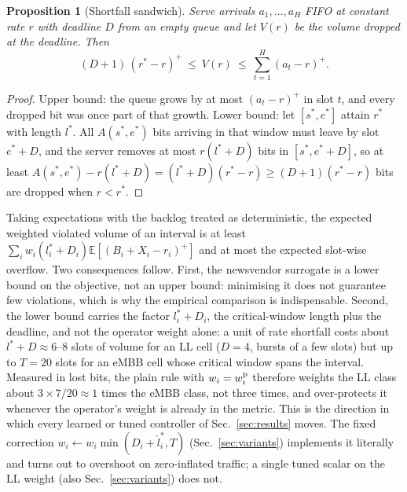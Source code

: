 \documentclass[journal]{IEEEtran}
\newtheorem{proposition}{Proposition}
\newcommand{\rstar}{r^{\ast}}
\newcommand{\E}{\mathbb{E}}
\begin{document}
\begin{proposition}[Shortfall sandwich]
\label{prop:sandwich}
Serve arrivals $a_1, \dots, a_H$ FIFO at constant rate $r$ with deadline $D$ from an empty queue and let $V(r)$ be the volume dropped at the deadline. Then
\begin{equation}
(D + 1)\,(\rstar - r)^+ \ \le\ V(r)\ \le\ \sum_{t = 1}^{H} (a_t - r)^+ .
\label{eq:sandwich}
\end{equation}
\end{proposition}
\begin{proof}
Upper bound: the queue grows by at most $(a_t - r)^+$ in slot $t$, and every dropped bit was once part of that growth. Lower bound: let $[s^\ast, e^\ast]$ attain $\rstar$ with length $l^\ast$. All $A(s^\ast, e^\ast)$ bits arriving in that window must leave by slot $e^\ast + D$, and the server removes at most $r(l^\ast + D)$ bits in $[s^\ast, e^\ast + D]$, so at least $A(s^\ast, e^\ast) - r(l^\ast + D) = (l^\ast + D)(\rstar - r) \ge (D + 1)(\rstar - r)$ bits are dropped when $r < \rstar$.
\end{proof}
Taking expectations with the backlog treated as deterministic, the expected weighted violated volume of an interval is at least $\sum_i w_i (l^\ast_i + D_i)\E[(B_i + X_i - r_i)^+]$ and at most the expected slot-wise overflow. Two consequences follow. First, the newsvendor surrogate is a lower bound on the objective, not an upper bound: minimising it does not guarantee few violations, which is why the empirical comparison is indispensable. Second, the lower bound carries the factor $l^\ast_i + D_i$, the critical-window length plus the deadline, and not the operator weight alone: a unit of rate shortfall costs about $l^\ast + D \approx 6$--$8$ slots of volume for an LL cell ($D = 4$, bursts of a few slots) but up to $T = 20$ slots for an eMBB cell whose critical window spans the interval. Measured in lost bits, the plain rule with $w_i = w_i^{\rm p}$ therefore weights the LL class about $3 \times 7/20 \approx 1$ times the eMBB class, not three times, and over-protects it whenever the operator's weight is already in the metric. This is the direction in which every learned or tuned controller of Sec.~\ref{sec:results} moves. The fixed correction $w_i \leftarrow w_i\min(D_i + \hat l^\ast_i, T)$ (Sec.~\ref{sec:variants}) implements it literally and turns out to overshoot on zero-inflated traffic; a single tuned scalar on the LL weight (also Sec.~\ref{sec:variants}) does not.
\end{document}
